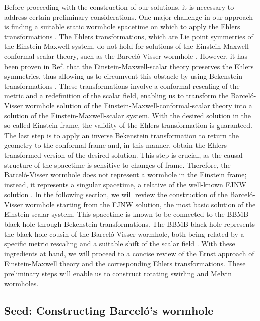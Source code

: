 \documentclass[aps,preprint,groupedaddress,nofootinbib,superscriptaddress,showkeys,showpacs,eqsecnum,amsmath,amssymb]{revtex4-1}
\begin{document}
Before proceeding with the construction of our solutions, it is necessary to address certain preliminary considerations. One major challenge in our approach is finding a suitable static wormhole spacetime on which to apply the Ehlers transformations \cite{Ehlers:1957zz,Harrison:1968}. The Ehlers transformations, which are Lie point symmetries of the Einstein-Maxwell system, do not hold for solutions of the Einstein-Maxwell-conformal-scalar theory, such as the Barcel\'o-Visser wormhole \cite{Barcelo:1999hq,Barcelo:2000zf}. However, it has been proven in Ref. \cite{Astorino:2013xc} that the Einstein-Maxwell-scalar theory preserves the Ehlers symmetries, thus allowing us to circumvent this obstacle by using Bekenstein transformations \cite{Bekenstein:1974sf}. These transformations involve a conformal rescaling of the metric and a redefinition of the scalar field, enabling us to transform the Barcel\'o-Visser wormhole solution of the Einstein-Maxwell-conformal-scalar theory into a solution of the Einstein-Maxwell-scalar system. With the desired solution in the so-called Einstein frame, the validity of the Ehlers transformation is guaranteed. The last step is to apply an inverse Bekenstein transformation to return the geometry to the conformal frame and, in this manner, obtain the Ehlers-transformed version of the desired solution. This step is crucial, as the causal structure of the spacetime is sensitive to changes of frame. Therefore, the Barcel\'o-Visser wormhole does not represent a wormhole in the Einstein frame; instead, it represents a singular spacetime, a relative of the well-known FJNW solution \cite{Janis:1969ivo}. In the following section, we will review the construction of the Barcel\'o-Visser wormhole starting from the FJNW solution, the most basic solution of the Einstein-scalar system. This spacetime is known to be connected to the BBMB black hole \cite{BBMB,Bekenstein:1974sf} through Bekenstein transformations. The BBMB black hole represents the black hole cousin of the Barcel\'o-Visser wormhole, both being related by a specific metric rescaling and a suitable shift of the scalar field \cite{Ayon-Beato:2015ada}. With these ingredients at hand, we will proceed to a concise review of the Ernst approach of Einstein-Maxwell theory and the corresponding Ehlers transformations. These preliminary steps will enable us to construct rotating swirling and Melvin wormholes.

\subsection{Seed: Constructing Barcel\'o's wormhole}
\end{document}
